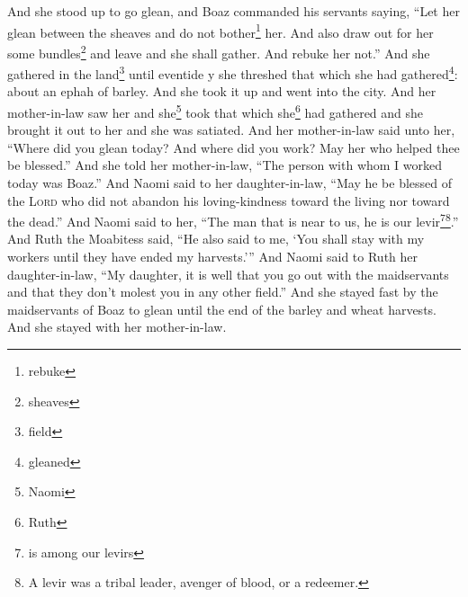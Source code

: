 \begin{inparaenum}
     And she stood up to go glean, and Boaz commanded his servants saying, ``Let her glean between the sheaves and do not bother\footnote{rebuke} her.%
     And also draw out for her some bundles\footnote{sheaves} and leave and she shall gather. And rebuke her not.''%
     And she gathered in the land\footnote{field} until eventide y she threshed that which she had gathered\footnote{gleaned}: about an ephah of barley.%
     And she took it up and went into the city. And her mother-in-law saw her and she\footnote{Naomi} took that which she\footnote{Ruth} had gathered and she brought it out to her and she was satiated.%
     And her mother-in-law said unto her, ``Where did you glean today? And where did you work? May her who helped thee be blessed.'' And she told her mother-in-law, ``The person with whom I worked today was Boaz.''%
     And Naomi said to her daughter-in-law, ``May he be blessed of the \textsc{Lord} who did not abandon his loving-kindness toward the living nor toward the dead.'' And Naomi said to her, ``The man that is near to us, he is our levir\footnote{is among our levirs}\footnote{A levir was a tribal leader, avenger of blood, or a redeemer.}.''%
     And Ruth the Moabitess said, ``He also said to me, `You shall stay with my workers until they have ended my harvests.'''%
     And Naomi said to Ruth her daughter-in-law, ``My daughter, it is well that you go out with the maidservants and that they don't molest you in any other field.''%
     And she stayed fast by the maidservants of Boaz to glean until the end of the barley and wheat harvests. And she stayed with her mother-in-law.%
\end{inparaenum}
